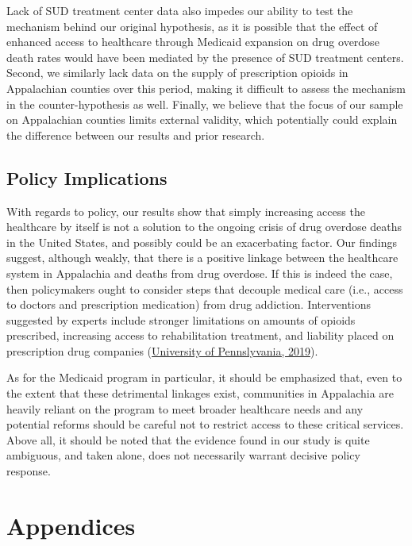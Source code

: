 \documentclass[
  11pt,
]{article}
\begin{document}
Lack of SUD treatment center data also impedes our ability to test the
mechanism behind our original hypothesis, as it is possible that the
effect of enhanced access to healthcare through Medicaid expansion on
drug overdose death rates would have been mediated by the presence of
SUD treatment centers. Second, we similarly lack data on the supply of
prescription opioids in Appalachian counties over this period, making it
difficult to assess the mechanism in the counter-hypothesis as well.
Finally, we believe that the focus of our sample on Appalachian counties
limits external validity, which potentially could explain the difference
between our results and prior research.

\hypertarget{policy-implications}{%
\subsection{Policy Implications}\label{policy-implications}}

With regards to policy, our results show that simply increasing access
the healthcare by itself is not a solution to the ongoing crisis of drug
overdose deaths in the United States, and possibly could be an
exacerbating factor. Our findings suggest, although weakly, that there
is a positive linkage between the healthcare system in Appalachia and
deaths from drug overdose. If this is indeed the case, then policymakers
ought to consider steps that decouple medical care (i.e., access to
doctors and prescription medication) from drug addiction. Interventions
suggested by experts include stronger limitations on amounts of opioids
prescribed, increasing access to rehabilitation treatment, and liability
placed on prescription drug companies
(\href{https://knowledge.wharton.upenn.edu/article/opioid-crisis-policy-solutions/}{University
of Pennslyvania, 2019}).

As for the Medicaid program in particular, it should be emphasized that,
even to the extent that these detrimental linkages exist, communities in
Appalachia are heavily reliant on the program to meet broader healthcare
needs and any potential reforms should be careful not to restrict access
to these critical services. Above all, it should be noted that the
evidence found in our study is quite ambiguous, and taken alone, does
not necessarily warrant decisive policy response.

\newpage

\hypertarget{appendices}{%
\section{Appendices}\label{appendices}}
\end{document}
